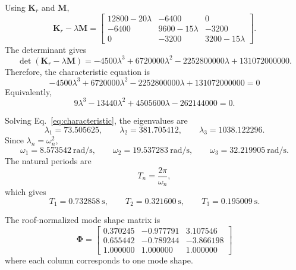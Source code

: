 \documentclass[11pt,a4paper]{article}
\begin{document}
Using $\bm{K}_r$ and $\bm{M}$,
\begin{equation}
\bm{K}_r-\lambda\bm{M}=
\begin{bmatrix}
12800-20\lambda & -6400 & 0\\
-6400 & 9600-15\lambda & -3200\\
0 & -3200 & 3200-15\lambda
\end{bmatrix}.
\end{equation}
The determinant gives
\begin{equation}
\det(\bm{K}_r-\lambda\bm{M})=
-4500\lambda^3
+6720000\lambda^2
-2252800000\lambda
+131072000000.
\end{equation}
Therefore, the characteristic equation is
\begin{equation}
\boxed{
-4500\lambda^3
+6720000\lambda^2
-2252800000\lambda
+131072000000=0
}
\label{eq:characteristic}
\end{equation}
Equivalently,
\begin{equation}
9\lambda^3-13440\lambda^2+4505600\lambda-262144000=0.
\end{equation}

Solving Eq.~\eqref{eq:characteristic}, the eigenvalues are
\begin{equation}
\lambda_1=73.505625,
\qquad
\lambda_2=381.705412,
\qquad
\lambda_3=1038.122296.
\end{equation}
Since $\lambda_n=\omega_n^2$,
\begin{equation}
\omega_1=8.573542\ \mathrm{rad/s},
\qquad
\omega_2=19.537283\ \mathrm{rad/s},
\qquad
\omega_3=32.219905\ \mathrm{rad/s}.
\end{equation}
The natural periods are
\begin{equation}
T_n=\frac{2\pi}{\omega_n},
\end{equation}
which gives
\begin{equation}
T_1=0.732858\ \mathrm{s},
\qquad
T_2=0.321600\ \mathrm{s},
\qquad
T_3=0.195009\ \mathrm{s}.
\end{equation}

The roof-normalized mode shape matrix is
\begin{equation}
\boxed{
\bm{\Phi}=
\begin{bmatrix}
0.370245 & -0.977791 & 3.107546\\
0.655442 & -0.789244 & -3.866198\\
1.000000 & 1.000000 & 1.000000
\end{bmatrix}
}
\label{eq:Phi}
\end{equation}
where each column corresponds to one mode shape.
\end{document}
